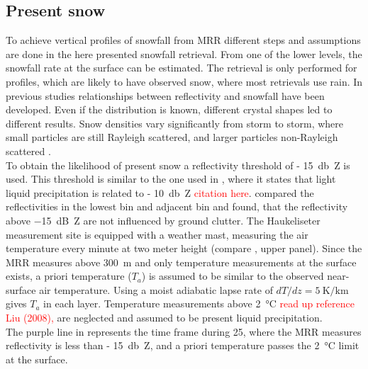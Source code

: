 \subsection{Present snow}\label{sec:pre_snow}

To achieve vertical profiles of snowfall from MRR different steps and assumptions are done in the here presented snowfall retrieval. From one of the lower levels, the snowfall rate at the surface can be estimated. The retrieval is only performed for profiles, which are likely to have observed snow, where most retrievals use rain. In previous studies relationships between reflectivity and snowfall have been developed. Even if the distribution is known, different crystal shapes led to different results. Snow densities vary significantly from storm to storm, where small particles are still Rayleigh scattered, and larger particles non-Rayleigh scattered \citep{gunn_microwave_1954}. 
\\
To obtain the likelihood of present snow a reflectivity threshold of \SI{- 15}{\decibel Z} is used. This threshold is similar to the one used in \cite{wood_level_2013}, where it states that light liquid precipitation is related to \SI{- 10}{\decibel Z} \textcolor{red}{citation here}. \cite{wood_estimation_2011} compared the reflectivities in the lowest bin and adjacent bin and found, that the reflectivity above \SI{-15}{\dB Z} are not influenced by ground clutter.
\newline
The Haukeliseter measurement site is equipped with a weather mast, measuring the air temperature every minute at two meter height (compare , upper panel). 
%
Since the MRR measures above \SI{300}{\metre} and only temperature measurements at the surface exists, a priori temperature ($T_{a}$) is assumed to be similar to the observed near-surface air temperature. Using a moist adiabatic lapse rate of $dT/dz = \SI{5}{\kelvin\per\km}$ gives $T_{a}$ in each layer. Temperature measurements above \SI{2}{\celsius} \textcolor{red}{read up reference Liu (2008), \cite{wood_level_2013}} are neglected and assumed to be present liquid precipitation. \\
The purple line in  represents the time frame during \SI{25}{\dec}, where the MRR measures reflectivity is less than \SI{- 15}{\decibel Z}, and a priori temperature passes the \SI{2}{\celsius} limit at the surface.  


